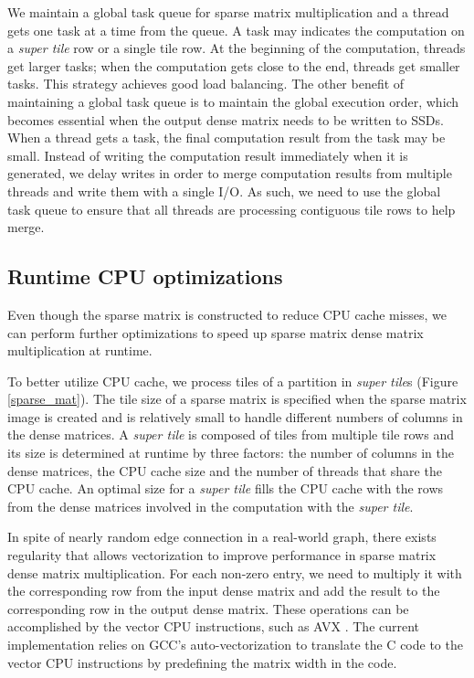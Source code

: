 We maintain a global task queue for sparse matrix multiplication and a
thread gets one task at a time from the queue. A task may
indicates the computation on a \textit{super tile} row or a single tile row.
At the beginning of the computation, threads get larger tasks; when
the computation gets close to the end, threads get smaller tasks. This strategy
achieves good load balancing. The other benefit of maintaining a global
task queue is to maintain the global execution order, which becomes essential
when the output dense matrix needs to be written to SSDs. When a thread gets
a task, the final computation result from the task may be small. Instead of
writing the computation result immediately when it is generated, we delay
writes in order to merge
computation results from multiple threads and write them with a single I/O.
As such, we need to use the global task queue to ensure that all threads are
processing contiguous tile rows to help merge.

\subsection{Runtime CPU optimizations} \label{sec:cpu}
Even though the sparse matrix is constructed to reduce CPU cache misses,
we can perform further optimizations to speed up sparse matrix dense matrix
multiplication at runtime.

To better utilize CPU cache, we process tiles of a partition in
\textit{super tile}s (Figure \ref{sparse_mat}). The tile size of a sparse
matrix is specified when the sparse matrix image is created and is relatively
small to handle different numbers of columns in the dense matrices.
A \textit{super tile} is composed of tiles from multiple tile rows and its
size is determined at runtime by three factors: the number of columns
in the dense matrices, the CPU cache size and the number of threads that
share the CPU cache. An optimal size for a \textit{super tile} fills
the CPU cache with the rows from the dense matrices involved in
the computation with the \textit{super tile}.

In spite of nearly random edge connection in a real-world graph,
there exists regularity  that allows vectorization to improve performance
in sparse matrix dense matrix multiplication. For each non-zero entry, we
need to multiply it with the corresponding row from the input dense matrix
and add the result to the corresponding row in the output dense matrix.
These operations can be accomplished by the vector CPU instructions, such as
AVX \cite{avx}. The current implementation relies on GCC's auto-vectorization
to translate the C code to the vector CPU instructions by predefining the matrix
width in the code.

